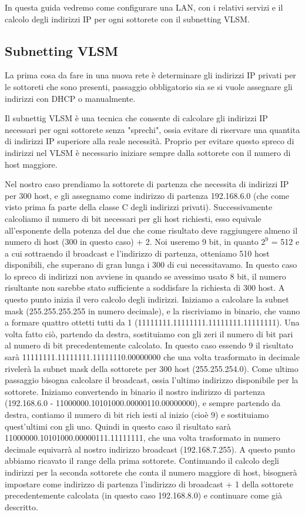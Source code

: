 In questa guida vedremo come configurare una LAN, con i relativi servizi e il calcolo degli indirizzi IP per ogni sottorete con il subnetting VLSM.

\subsection{Subnetting VLSM}
La prima cosa da fare in una nuova rete è determinare gli indirizzi IP privati per le sottoreti che sono presenti, passaggio obbligatorio sia se si vuole assegnare gli indirizzi con DHCP o manualmente.

Il subnettig VLSM è una tecnica che consente di calcolare gli indirizzi IP necessari per ogni sottorete senza "sprechi", ossia evitare di riservare una quantita di indirizzi IP superiore alla reale necessità.
Proprio per evitare questo spreco di indirizzi nel VLSM è necessario iniziare sempre dalla sottorete con il numero di host maggiore.

Nel nostro caso prendiamo la sottorete di partenza che necessita di indirizzi IP per 300 host, e gli assegnamo come indirizzo di partenza 192.168.6.0 (che come visto prima fa parte della classe C degli indirizzi privati). Successivamente calcoliamo il numero di bit necessari per gli host richiesti, esso equivale all’esponente della potenza del due che come risultato deve raggiungere almeno il numero di host (300 in questo caso) + 2. 
\newline
Noi useremo 9 bit, in quanto $2^9$ = 512 e a cui sottraendo il broadcast e l’indirizzo di partenza, otteniamo 510 host disponibili, che superano di gran lunga i 300 di cui necessitavamo. In questo caso lo spreco di indirizzi non avviene in quando se avessimo usato 8 bit, il numero risultante non sarebbe stato sufficiente a soddisfare la richiesta di 300 host.
A questo punto inizia il vero calcolo degli indirizzi. Iniziamo a calcolare la subnet mask (255.255.255.255 in numero decimale), e la riscriviamo in binario, che vanno a formare quattro ottetti tutti da 1 (11111111.11111111.11111111.11111111). Una volta fatto ciò, partendo da destra, sostituiamo con gli zeri il numero di bit pari al numero di bit precedentemente calcolato. In questo caso essendo 9 il risultato sarà 11111111.11111111.11111110.00000000 che una volta trasformato in decimale rivelerà la subnet mask della sottorete per 300 host (255.255.254.0). 
Come ultimo passaggio bisogna calcolare il broadcast, ossia l'ultimo indirizzo disponibile per la sottorete. Iniziamo convertendo in binario il nostro indirizzo di partenza (192.168.6.0 - 11000000.10101000.00000110.00000000), e sempre partendo da destra, contiamo il numero di bit rich iesti al inizio (cioè 9) e sostituiamo quest'ultimi con gli uno. Quindi in questo caso il risultato sarà 11000000.10101000.00000111.11111111, che una volta trasformato in numero decimale equivarrà al nostro indirizzo broadcast (192.168.7.255).
A questo punto abbiamo ricavato il range della prima sottorete. Continuando il calcolo degli indirizzi per la seconda sottorete che conta il numero maggiore di host, bisognerà impostare come indirizzo di partenza l'indirizzo di broadcast + 1 della sottorete precedentemente calcolata (in questo caso 192.168.8.0) e continuare come già descritto.

